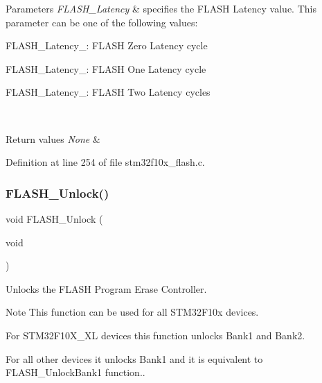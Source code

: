 \begin{DoxyParams}{Parameters}
{\em F\+L\+A\+S\+H\+\_\+\+Latency} & specifies the F\+L\+A\+SH Latency value. This parameter can be one of the following values\+: \begin{DoxyItemize}
\item F\+L\+A\+S\+H\+\_\+\+Latency\+\_\+: F\+L\+A\+SH Zero Latency cycle \item F\+L\+A\+S\+H\+\_\+\+Latency\+\_\+: F\+L\+A\+SH One Latency cycle \item F\+L\+A\+S\+H\+\_\+\+Latency\+\_\+: F\+L\+A\+SH Two Latency cycles \end{DoxyItemize}
\\
\hline
\end{DoxyParams}

\begin{DoxyRetVals}{Return values}
{\em None} & \\
\hline
\end{DoxyRetVals}


Definition at line 254 of file stm32f10x\+\_\+flash.\+c.

\mbox{\label{group___f_l_a_s_h___private___functions_ga4084d0184bab463a1579271bf474aaef}} 
\subsubsection{\texorpdfstring{F\+L\+A\+S\+H\+\_\+\+Unlock()}{FLASH\_Unlock()}}
{\footnotesize\ttfamily void F\+L\+A\+S\+H\+\_\+\+Unlock (\begin{DoxyParamCaption}\item[{void}]{ }\end{DoxyParamCaption})}



Unlocks the F\+L\+A\+SH Program Erase Controller. 

\begin{DoxyNote}{Note}
This function can be used for all S\+T\+M32\+F10x devices.
\begin{DoxyItemize}
\item For S\+T\+M32\+F10\+X\+\_\+\+XL devices this function unlocks Bank1 and Bank2.
\item For all other devices it unlocks Bank1 and it is equivalent to F\+L\+A\+S\+H\+\_\+\+Unlock\+Bank1 function.. 
\end{DoxyItemize}
\end{DoxyNote}

